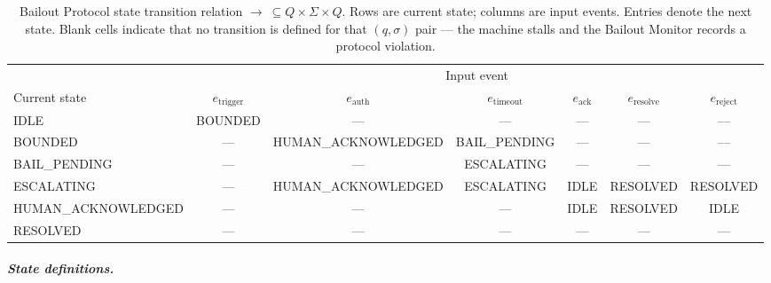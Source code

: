 \begin{table}[htbp]
\caption{Bailout Protocol state transition relation $\rightarrow\ \subseteq Q \times \Sigma \times Q$. Rows are current state; columns are input events. Entries denote the next state. Blank cells indicate that no transition is defined for that $(q, \sigma)$ pair — the machine stalls and the Bailout Monitor records a protocol violation.}
\label{tab:transition-relation}
\begin{tabular}{@{}lcccccc@{}}
\toprule
 & \multicolumn{6}{c}{Input event} \\
\cmidrule(l){2-7}
Current state & $e_{\text{trigger}}$ & $e_{\text{auth}}$ & $e_{\text{timeout}}$ & $e_{\text{ack}}$ & $e_{\text{resolve}}$ & $e_{\text{reject}}$ \\
\midrule
IDLE & BOUNDED & — & — & — & — & — \\
BOUNDED & — & HUMAN\_ACKNOWLEDGED & BAIL\_PENDING & — & — & — \\
BAIL\_PENDING & — & — & ESCALATING & — & — & — \\
ESCALATING & — & HUMAN\_ACKNOWLEDGED & ESCALATING & IDLE & RESOLVED & RESOLVED \\
HUMAN\_ACKNOWLEDGED & — & — & — & IDLE & RESOLVED & IDLE \\
RESOLVED & — & — & — & — & — & — \\
\bottomrule
\end{tabular}
\end{table}

\subparagraph{State definitions.}

